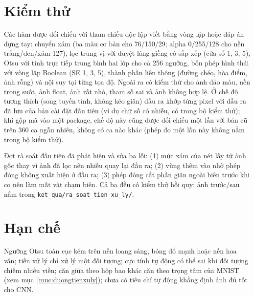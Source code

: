 \section{Kiểm thử}
Các hàm được đối chiếu với tham chiếu độc lập viết bằng vòng lặp hoặc đáp án dựng tay: chuyển xám (ba màu cơ bản cho 76/150/29; alpha 0/255/128 cho nền trắng/đen/xám 127),
lọc trung vị với duyệt láng giềng có sắp xếp (cửa sổ 1, 3, 5), Otsu với tính trực tiếp trung bình hai lớp cho cả 256 ngưỡng, bốn phép hình thái với vòng lặp Boolean (SE 1, 3, 5),
thành phần liên thông (đường chéo, hòa điểm, ảnh rỗng) và nội suy tại từng tọa độ. Ngoài ra có kiểm thử cho ảnh đảo màu, nền trong suốt, ảnh float, ảnh rất nhỏ, tham số sai
và ảnh không hợp lệ. Ở chế độ tương thích (song tuyến tính, không kéo giãn) đầu ra khớp từng pixel với đầu ra đã lưu của bản cài đặt đầu tiên (ví dụ chữ số có nhiễu, có trong bộ kiểm thử); khi gộp mã vào một package, chế độ này cũng được đối chiếu một lần với bản cũ trên 360 ca ngẫu nhiên, không có ca nào khác (phép đo một lần này không nằm trong bộ kiểm thử).

Đợt rà soát đầu tiên đã phát hiện và sửa ba lỗi: (1) mức xám của nét lấy từ ảnh gốc thay vì ảnh đã lọc nên nhiễu quay lại đầu ra; (2) vùng thêm vào nhờ phép đóng
không xuất hiện ở đầu ra; (3) phép đóng cắt phần giãn ngoài biên trước khi co nên làm mất vật chạm biên. Cả ba đều có kiểm thử hồi quy; ảnh trước/sau nằm trong
\texttt{ket\_qua/ra\_soat\_tien\_xu\_ly/}.

\section{Hạn chế}
Ngưỡng Otsu toàn cục kém trên nền loang sáng, bóng đổ mạnh hoặc nền hoa văn; tiền xử lý chỉ xử lý một đối tượng; cực tính tự động có thể sai khi đối tượng chiếm nhiều viền;
căn giữa theo hộp bao khác căn theo trọng tâm của MNIST (xem mục~\ref{muc:duongtienxuly}); chưa có tiêu chí tự động khẳng định ảnh đủ tốt cho CNN.
